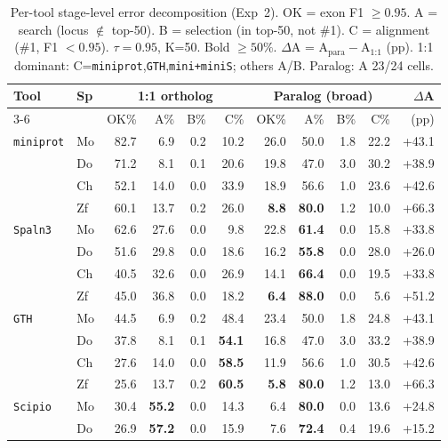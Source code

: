 \begin{table}[!t]
\centering
\caption{Per-tool stage-level error decomposition (Exp~2). OK = exon F1 $\ge 0.95$. A = search (locus $\notin$ top-50). B = selection (in top-50, not \#1). C = alignment (\#1, F1 $< 0.95$). $\tau=0.95$, K=50. Bold $\ge 50\%$. $\Delta$A = A$_{\text{para}} - $A$_{\text{1:1}}$ (pp). 1:1 dominant: C=\texttt{miniprot},\texttt{GTH},\texttt{mini+miniS}; others A/B. Paralog: A 23/24 cells.}
\label{tab:s_exp2_abc}
\footnotesize
\setlength{\tabcolsep}{2pt}
\begin{tabular}{llrrrrrrrrr}
\toprule
Tool & Sp & \multicolumn{4}{c}{1:1 ortholog} & \multicolumn{4}{c}{Paralog (broad)} & $\Delta$A \\
\cmidrule{3-6} \cmidrule{7-10}
 & & OK\% & A\% & B\% & C\% & OK\% & A\% & B\% & C\% & (pp) \\
\midrule
\texttt{miniprot} & Mo & 82.7 & 6.9 & 0.2 & 10.2 & 26.0 & 50.0 & 1.8 & 22.2 & +43.1 \\
 & Do & 71.2 & 8.1 & 0.1 & 20.6 & 19.8 & 47.0 & 3.0 & 30.2 & +38.9 \\
 & Ch & 52.1 & 14.0 & 0.0 & 33.9 & 18.9 & 56.6 & 1.0 & 23.6 & +42.6 \\
 & Zf & 60.1 & 13.7 & 0.2 & 26.0 & \textbf{8.8} & \textbf{80.0} & 1.2 & 10.0 & +66.3 \\
\midrule
\texttt{Spaln3} & Mo & 62.6 & 27.6 & 0.0 & 9.8 & 22.8 & \textbf{61.4} & 0.0 & 15.8 & +33.8 \\
 & Do & 51.6 & 29.8 & 0.0 & 18.6 & 16.2 & \textbf{55.8} & 0.0 & 28.0 & +26.0 \\
 & Ch & 40.5 & 32.6 & 0.0 & 26.9 & 14.1 & \textbf{66.4} & 0.0 & 19.5 & +33.8 \\
 & Zf & 45.0 & 36.8 & 0.0 & 18.2 & \textbf{6.4} & \textbf{88.0} & 0.0 & 5.6 & +51.2 \\
\midrule
\texttt{GTH} & Mo & 44.5 & 6.9 & 0.2 & 48.4 & 23.4 & 50.0 & 1.8 & 24.8 & +43.1 \\
 & Do & 37.8 & 8.1 & 0.1 & \textbf{54.1} & 16.8 & 47.0 & 3.0 & 33.2 & +38.9 \\
 & Ch & 27.6 & 14.0 & 0.0 & \textbf{58.5} & 11.9 & 56.6 & 1.0 & 30.5 & +42.6 \\
 & Zf & 25.6 & 13.7 & 0.2 & \textbf{60.5} & \textbf{5.8} & \textbf{80.0} & 1.2 & 13.0 & +66.3 \\
\midrule
\texttt{Scipio} & Mo & 30.4 & \textbf{55.2} & 0.0 & 14.3 & 6.4 & \textbf{80.0} & 0.0 & 13.6 & +24.8 \\
 & Do & 26.9 & \textbf{57.2} & 0.0 & 15.9 & 7.6 & \textbf{72.4} & 0.4 & 19.6 & +15.2 \\

\end{tabular}
\end{table}
